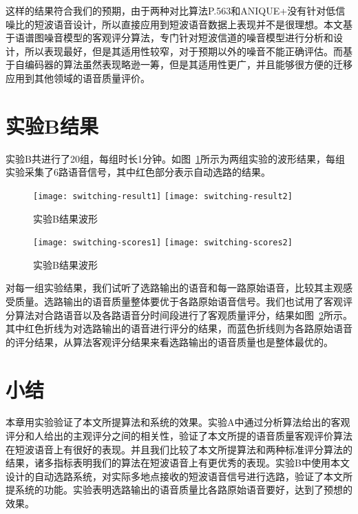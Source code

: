 这样的结果符合我们的预期，由于两种对比算法P.563和ANIQUE+没有针对低信噪比的短波语音设计，所以直接应用到短波语音数据上表现并不是很理想。本文基于语谱图噪音模型的客观评分算法，专门针对短波信道的噪音模型进行分析和设计，所以表现最好，但是其适用性较窄，对于预期以外的噪音不能正确评估。而基于自编码器的算法虽然表现略逊一筹，但是其适用性更广，并且能够很方便的迁移应用到其他领域的语音质量评价。

\section{实验B结果}

实验B共进行了20组，每组时长1分钟。如图~\ref{fig:switching-result}所示为两组实验的波形结果，每组实验采集了6路语音信号，其中红色部分表示自动选路的结果。

\begin{figure}
\centering
\texttt{[image: switching-result1]}
\texttt{[image: switching-result2]}
\caption{实验B结果波形\label{fig:switching-result}}
\end{figure}

\begin{figure}
\centering
\texttt{[image: switching-scores1]}
\texttt{[image: switching-scores2]}
\caption{实验B结果波形\label{fig:switching-scores}}
\end{figure}

对每一组实验结果，我们试听了选路输出的语音和每一路原始语音，比较其主观感受质量。选路输出的语音质量整体要优于各路原始语音信号。我们也试用了客观评分算法对合路语音以及各路语音分时间段进行了客观质量评分，结果如图~\ref{fig:switching-scores}所示。其中红色折线为对选路输出的语音进行评分的结果，而蓝色折线则为各路原始语音的评分结果，从算法客观评分结果来看选路输出的语音质量也是整体最优的。

\section{小结}

本章用实验验证了本文所提算法和系统的效果。实验A中通过分析算法给出的客观评分和人给出的主观评分之间的相关性，验证了本文所提的语音质量客观评价算法在短波语音上有很好的表现。并且我们比较了本文所提算法和两种标准评分算法的结果，诸多指标表明我们的算法在短波语音上有更优秀的表现。实验B中使用本文设计的自动选路系统，对实际多地点接收的短波语音信号进行选路，验证了本文所提系统的功能。实验表明选路输出的语音质量比各路原始语音要好，达到了预想的效果。